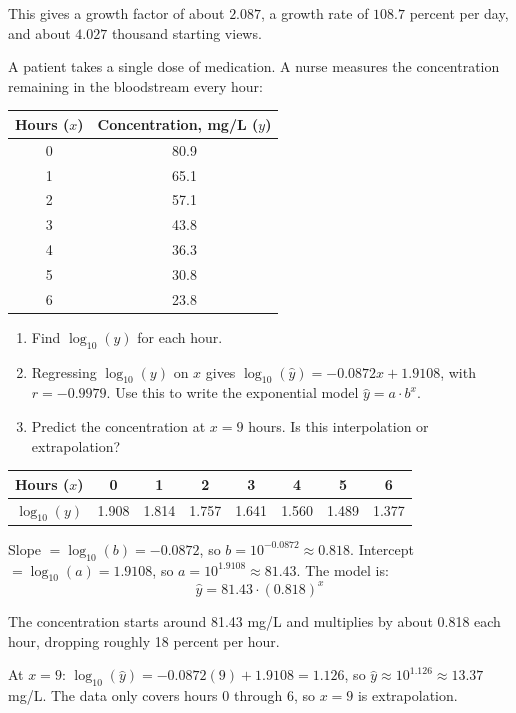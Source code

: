 This gives a growth factor of about $2.087$, a growth rate of $108.7$ percent per day, and about $4.027$ thousand starting views. 

\begin{Exercise}[title={Medication Concentration}, label=med_decay]

A patient takes a single dose of medication. A nurse measures the concentration remaining in the bloodstream every hour:

\begin{table}[H]
\begin{tabular}{c|c}
Hours ($x$) & Concentration, mg/L ($y$) \\
\hline
0 & 80.9 \\
1 & 65.1 \\
2 & 57.1 \\
3 & 43.8 \\
4 & 36.3 \\
5 & 30.8 \\
6 & 23.8
\end{tabular}
\end{table}

\begin{enumerate}
    \item Find $\log_{10}(y)$ for each hour.
    \item Regressing $\log_{10}(y)$ on $x$ gives $\log_{10}(\hat{y}) = -0.0872x + 1.9108$, with $r = -0.9979$. Use this to write the exponential model $\hat{y} = a \cdot b^x$.
    \item Predict the concentration at $x = 9$ hours. Is this interpolation or extrapolation?
\end{enumerate}

\end{Exercise}
\begin{Answer}[ref=med_decay]

\begin{table}[H]
\centering
\begin{tabular}{c|ccccccc}
Hours ($x$) & 0 & 1 & 2 & 3 & 4 & 5 & 6 \\
\hline
$\log_{10}(y)$ & 1.908 & 1.814 & 1.757 & 1.641 & 1.560 & 1.489 & 1.377
\end{tabular}
\end{table}

Slope $= \log_{10}(b) = -0.0872$, so $b = 10^{-0.0872} \approx 0.818$. Intercept $= \log_{10}(a) = 1.9108$, so $a = 10^{1.9108} \approx 81.43$. The model is:
\[
\hat{y} = 81.43 \cdot (0.818)^x
\]

The concentration starts around 81.43 mg/L and multiplies by about 0.818 each hour, dropping roughly 18 percent per hour.

At $x = 9$: $\log_{10}(\hat{y}) = -0.0872(9) + 1.9108 = 1.126$, so $\hat{y} \approx 10^{1.126} \approx 13.37$ mg/L. The data only covers hours 0 through 6, so $x = 9$ is extrapolation.

\end{Answer}

